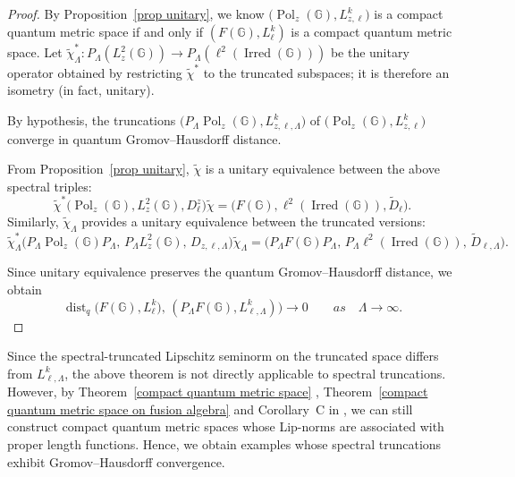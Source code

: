 \documentclass[12pt, reqno]{amsart}
\theoremstyle{definition}
\theoremstyle{remark}
\numberwithin{equation}{section}
\begin{document}
\begin{proof}
 By Proposition~\ref{prop unitary}, we know 
 $\bigl(\operatorname{Pol}_z(\mathbb{G}), L_{z,\ell}^k\bigr)$ is a compact 
 quantum metric space if and only if $(F(\mathbb{G}), L_{\ell}^k)$ is a compact 
 quantum metric space. Let 
 $\tilde{\chi}_\Lambda^* \colon P_\Lambda(L^2_z(\mathbb{G})) \to 
 P_\Lambda(\ell^2(\operatorname{Irred}(\mathbb{G})))$ be the unitary operator 
 obtained by restricting $\tilde{\chi}^*$ to the truncated subspaces; it is 
 therefore an isometry (in fact, unitary).

 By hypothesis, the  truncations $\bigl(P_\Lambda\operatorname{Pol}_z(\mathbb{G}), L_{z,\ell,\Lambda}^k\bigr)$ of 
 $\bigl(\operatorname{Pol}_z(\mathbb{G}), L_{z,\ell}^k\bigr)$ converge in quantum 
 Gromov--Hausdorff distance.

 From Proposition~\ref{prop unitary}, $\tilde{\chi}$ is a unitary equivalence 
 between the above spectral triples:
 \[
 \tilde{\chi}^{*}\bigl(\operatorname{Pol}_z(\mathbb{G}), L^2_z(\mathbb{G}), D_\ell^z\bigr)
 \tilde{\chi} = \bigl(F(\mathbb{G}), \ell^2(\operatorname{Irred}(\mathbb{G})), 
 \tilde{D}_\ell\bigr).
 \]
 Similarly, $\tilde{\chi}_\Lambda$ provides a unitary equivalence between the 
 truncated versions:
 \[
 \tilde{\chi}_\Lambda^{*}\bigl(P_\Lambda\operatorname{Pol}_z(\mathbb{G}) P_\Lambda,\,
 P_\Lambda L^2_z(\mathbb{G}),\, D_{z,\ell,\Lambda}\bigr) \tilde{\chi}_\Lambda 
 = \bigl(P_\Lambda F(\mathbb{G}) P_\Lambda,\, P_\Lambda\ell^2(\operatorname{Irred}(\mathbb{G})),\,
 \tilde{D}_{\ell,\Lambda}\bigr).
 \]

 Since unitary equivalence preserves the quantum Gromov--Hausdorff distance, 
 we obtain
 \[
 \operatorname{dist}_q\bigl(F(\mathbb{G}), L_{\ell}^k\bigr),\, 
 (P_\Lambda F(\mathbb{G}) , L^k_{\ell,\Lambda})\bigr) \to 0 \qquad as \quad\Lambda\to \infty.
 \]
\end{proof}

Since the spectral-truncated Lipschitz seminorm on the truncated space differs from $L_{\ell,\Lambda}^k$, the above theorem is not directly applicable to spectral truncations. However, by Theorem~\ref{compact quantum metric space} , Theorem~\ref{compact quantum metric space on fusion algebra} and  Corollary~C in \cite{16}, we can still construct compact quantum metric spaces whose Lip-norms are associated with proper length functions. Hence, we obtain examples whose spectral truncations exhibit Gromov--Hausdorff convergence.
\end{document}
